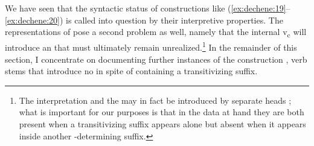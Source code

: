\documentclass[output=paper,
modfonts
]{LSP/langsci}
\begin{document}
We have seen that the syntactic status of constructions like (\ref{ex:dechene:19}--\ref{ex:dechene:20})
is called into question by their interpretive properties. The
representations of  pose a second problem as well, namely that the
internal v\textsubscript{c} will introduce an  that
must ultimately remain unrealized.\footnote{The  interpretation
  and the  may in fact be introduced by separate heads \citep[chapter 3]{pylkka2008a}; what is important for our purposes is that in the data at hand they are both present when a transitivizing
  suffix appears alone but absent when it appears inside another
  -determining suffix.} In the remainder of this section, I
concentrate on documenting further instances of the construction ,
verb stems that introduce no  in spite of containing a
transitivizing suffix.
\end{document}
